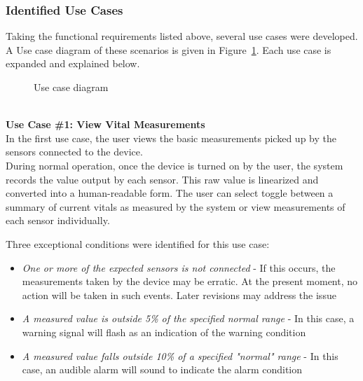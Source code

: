 \documentclass[12pt]{article} %
\begin{document}
\subsubsection{Identified Use Cases}
Taking the functional requirements listed above, several use cases were
developed. A Use case diagram of these scenarios is given in
Figure~\ref{fig:useCases}. Each use case is expanded and explained below.

\begin{figure}[h]
  \centering
  \caption{Use case diagram}
  \label{fig:useCases}
\end{figure}

~\\
\textbf{Use Case \#1: View Vital Measurements } \\
In the first use case, the user views the basic measurements picked up by the
sensors connected to the device. \\
During normal operation, once the device is turned on by the user, the system
records the value output by each sensor. This raw value is linearized and 
converted into a human-readable form. The user can select toggle between a
summary of current vitals as measured by the system or view measurements of
each sensor individually.

Three exceptional conditions were identified for this use case: 
\begin{itemize}
  \item \emph{One or more of the expected sensors is not connected} - If this occurs, the measurements taken by the device may be erratic. At the present moment, no action will be taken in such events. Later revisions may address the issue
  \item \emph{A measured value is outside 5\% of the specified normal range} - In this case, a warning signal will flash as an indication of the warning condition
  \item \emph{A measured value falls outside 10\% of a specified "normal" range} - In this case, an audible alarm will sound to indicate the alarm condition
\end{itemize}
\end{document}
